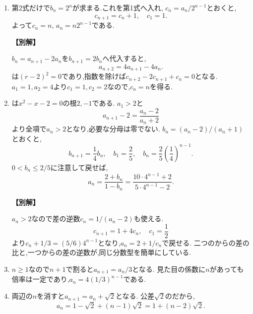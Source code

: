 \begin{enumerate}[label=\textbf{問\arabic*.},leftmargin=3.8em,format=\bookitemlink{practice-basic}{solution}{problem}]
          \item 第2式だけで$b_n=2^n$が求まる.これを第1式へ入れ,
                  $c_n=a_n/2^{n-1}$とおくと,
                  \[
                    c_{n+1}=c_n+1,\quad c_1=1.
                  \]
                  よって$c_n=n$, $a_n=n2^{n-1}$である.
                  \par\smallskip\noindent\textbf{【別解】}\par
                  $b_n=a_{n+1}-2a_n$を$b_{n+1}=2b_n$へ代入すると,
                  \[
                    a_{n+2}=4a_{n+1}-4a_n.
                  \]
                  は$(r-2)^2=0$であり,指数を除けば$c_{n+2}-2c_{n+1}+c_n=0$となる.
                  $a_1=1,a_2=4$より$c_1=1,c_2=2$なので,$c_n=n$を得る.

          \item {}は$x^2-x-2=0$の根$2,-1$である.
                  $a_1>2$と
                  \[
                    a_{n+1}-2=\frac{a_n-2}{a_n+2}
                  \]
                  より全項で$a_n>2$となり,必要な分母は零でない.
                  $b_n=(a_n-2)/(a_n+1)$とおくと,
                  \[
                    b_{n+1}=\frac14b_n,\quad b_1=\frac25,
                    \quad b_n=\frac25\left(\frac14\right)^{n-1}.
                  \]
                  $0<b_n\le2/5$に注意して戻せば,
                  \[
                    a_n=\frac{2+b_n}{1-b_n}
                       =\frac{10\cdot4^{n-1}+2}{5\cdot4^{n-1}-2}.
                  \]
                  \par\smallskip\noindent\textbf{【別解】}\par
                  $a_n>2$なので差の逆数$c_n=1/(a_n-2)$も使える.
                  \[
                    c_{n+1}=1+4c_n,\quad c_1=\frac12
                  \]
                  より$c_n+1/3=(5/6)4^{n-1}$となり,$a_n=2+1/c_n$で戻せる.
                  二つのからの差の比と,一つからの差の逆数が,同じ分数型を簡単にしている.

          \item $n\ge1$なので$n+1$で割ると$a_{n+1}=a_n/3$となる.
                  見た目の係数に$n$があっても倍率は一定であり,$a_n=4(1/3)^{n-1}$である.

          \item 両辺の$n$を消すと$a_{n+1}=a_n+\sqrt2$となる.
                  公差$\sqrt2$のだから,
                  \[
                    a_n=1-\sqrt2+(n-1)\sqrt2=1+(n-2)\sqrt2.
                  \]


\end{enumerate}
